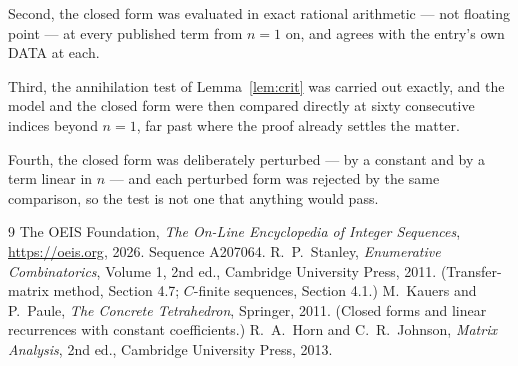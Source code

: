 \documentclass[11pt,a4paper]{article}
\theoremstyle{plain}
\theoremstyle{definition}
\begin{document}
Second, the closed form was evaluated in exact rational arithmetic --- not floating point ---
at every published term from $n=1$ on, and agrees with the entry's own DATA at each.

Third, the annihilation test of Lemma~\ref{lem:crit} was carried out exactly, and the model
and the closed form were then compared directly at sixty consecutive indices beyond
$n=1$, far past where the proof already settles the matter.

Fourth, the closed form was deliberately perturbed --- by a constant and by a term linear in
$n$ --- and each perturbed form was rejected by the same comparison, so the test is not one
that anything would pass.

\begin{thebibliography}{9}
 The OEIS Foundation, \emph{The On-Line Encyclopedia of Integer
Sequences}, \url{https://oeis.org}, 2026. Sequence A207064.
 R.~P.~Stanley, \emph{Enumerative Combinatorics}, Volume 1, 2nd ed.,
Cambridge University Press, 2011. (Transfer-matrix method, Section 4.7; $C$-finite sequences,
Section 4.1.)
 M.~Kauers and P.~Paule, \emph{The Concrete Tetrahedron}, Springer, 2011.
(Closed forms and linear recurrences with constant coefficients.)
 R.~A.~Horn and C.~R.~Johnson, \emph{Matrix Analysis}, 2nd ed., Cambridge
University Press, 2013.
\end{thebibliography}
\end{document}
